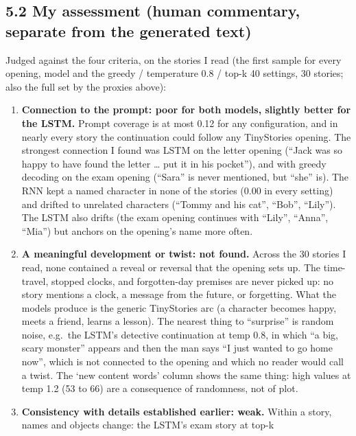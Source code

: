 \documentclass[10pt,a4paper]{article}
\providecommand{\tightlist}{\setlength{\itemsep}{0pt}\setlength{\parskip}{0pt}}
\begin{document}
\hypertarget{my-assessment-human-commentary-separate-from-the-generated-text}{%
\subsection{5.2 My assessment (human commentary, separate from the generated text)}\label{my-assessment-human-commentary-separate-from-the-generated-text}}

Judged against the four criteria, on the stories I read (the first sample for every opening, model and the
greedy / temperature 0.8 / top-k 40 settings, 30 stories; also the full set by the proxies above):

\begin{enumerate}
\def\labelenumi{\arabic{enumi}.}
\tightlist
\item
  \textbf{Connection to the prompt: poor for both models, slightly better for the LSTM.} Prompt coverage is at most 0.12 for any configuration, and in nearly every
  story the continuation could follow any TinyStories opening. The strongest connection I found was LSTM
  on the letter opening (``Jack was so happy to have found the letter \ldots{} put it in his pocket''), and with greedy decoding on the
  exam opening (``Sara'' is never mentioned, but ``she'' is). The RNN kept a named character in none of the stories
  (0.00 in every setting) and drifted to unrelated characters (``Tommy and his cat'', ``Bob'', ``Lily''). The LSTM
  also drifts (the exam opening continues with ``Lily'', ``Anna'', ``Mia'') but anchors on the opening's name more often.
\item
  \textbf{A meaningful development or twist: not found.} Across the 30 stories I read, none contained a reveal or
  reversal that the opening sets up. The time-travel, stopped clocks, and forgotten-day premises are never picked up:
  no story mentions a clock, a message from the future, or forgetting. What the models produce is the generic
  TinyStories arc (a character becomes happy, meets a friend, learns a lesson). The nearest thing to ``surprise'' is
  random noise, e.g.~the LSTM's detective continuation at temp 0.8, in which ``a big, scary monster'' appears and then the
  man says ``I just wanted to go home now'', which is not connected to the opening and which no reader would call a twist.
  The `new content words' column shows the same thing: high values at temp 1.2 (53 to 66) are a consequence of randomness, not of plot.
\item
  \textbf{Consistency with details established earlier: weak.} Within a story, names and objects change: the LSTM's exam story at top-k

\end{enumerate}
\end{document}
